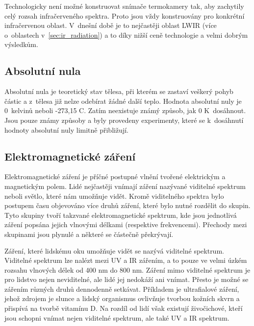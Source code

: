 Technologicky není možné konstruovat snímače termokamery tak, aby zachytily celý rozsah infračerveného spektra. Proto jsou vždy konstruovány pro konkrétní infračervenou oblast. V~dnešní době je to nejčastěji oblast LWIR (více o~oblastech v~\ref{sec:ir_radiation}) a to díky nižší ceně technologie a velmi dobrým výsledkům.    
    
   	\subsection{Absolutní nula}
    Absolutní nula je teoretický stav tělesa, při kterém se zastaví veškerý pohyb částic a z~tělesa již nelze odebírat žádné další teplo. Hodnota absolutní nuly je 0~kelvinů neboli -273,15 \textdegree{}C. Zatím neexistuje známý způsob, jak 0 K~dosáhnout. Jsou pouze známy způsoby a byly provedeny experimenty, které se k~dosáhnutí hodnoty absolutní nuly limitně přibližují. 
       
    \subsection{Elektromagnetické záření}
       Elektromagnetické záření je příčné postupné vlnění tvořené elektrickým a magnetickým polem. Lidé nejčastěji vnímají záření nazývané viditelné spektrum neboli světlo, které nám umožňuje vidět. Kromě viditelného spektra bylo postupem času objevováno více druhů záření, které bylo nutné rozdělit do skupin. Tyto skupiny tvoří takzvané elektromagnetické spektrum, kde jsou jednotlivá záření popsána jejich vlnovými délkami (respektive frekvencemi). Přechody mezi skupinami jsou plynulé a některé se částečně překrývají. 
       
       Záření, které lidskému oku umožňuje vidět se nazývá viditelné spektrum. Viditelné spektrum lze nalézt  mezi UV a IR zářením, a to pouze ve velmi úzkém rozsahu vlnových délek od 400 nm do 800 nm. Záření mimo viditelné spektrum je pro lidstvo nejen neviditelné, ale lidé jej nedokáží ani vnímat. Přesto je možné se zářením různých druhů dennodenně setkávat. Příkladem je ultrafialové záření, jehož zdrojem je slunce a lidský organismus ovlivňuje tvorbou kožních skvrn a přispívá na tvorbě vitamínu D. Na rozdíl od lidí však existují živočichové, kteří jsou schopni vnímat nejen viditelné spektrum, ale také UV a IR spektrum. \cite{smrvz2013bezkontaktni, kadleckzadkladymereni1} 
                   

